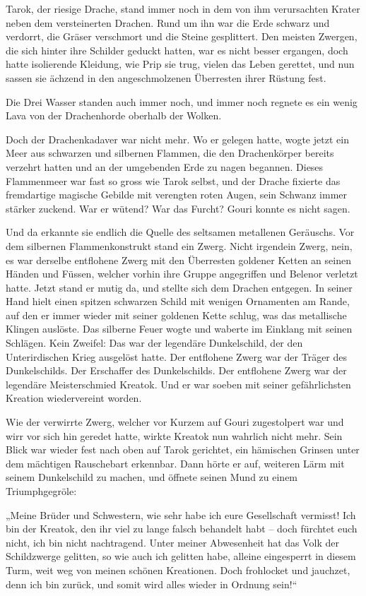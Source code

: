 Tarok, der riesige Drache, stand immer noch in dem von ihm verursachten Krater neben dem versteinerten Drachen. Rund um ihn war die Erde schwarz und verdorrt, die Gräser verschmort und die Steine gesplittert. Den meisten Zwergen, die sich hinter ihre Schilder geduckt hatten, war es nicht besser ergangen, doch hatte isolierende Kleidung, wie Prip sie trug, vielen das Leben gerettet, und nun sassen sie ächzend in den angeschmolzenen Überresten ihrer Rüstung fest.

Die Drei Wasser standen auch immer noch, und immer noch regnete es ein wenig Lava von der Drachenhorde oberhalb der Wolken.

Doch der Drachenkadaver war nicht mehr. Wo er gelegen hatte, wogte jetzt ein Meer aus schwarzen und silbernen Flammen, die den Drachenkörper bereits verzehrt hatten und an der umgebenden Erde zu nagen begannen. Dieses Flammenmeer war fast so gross wie Tarok selbst, und der Drache fixierte das fremdartige magische Gebilde mit verengten roten Augen, sein Schwanz immer stärker zuckend. War er wütend? War das Furcht? Gouri konnte es nicht sagen.

Und da erkannte sie endlich die Quelle des seltsamen metallenen Geräuschs. Vor dem silbernen Flammenkonstrukt stand ein Zwerg. Nicht irgendein Zwerg, nein, es war derselbe entflohene Zwerg mit den Überresten goldener Ketten an seinen Händen und Füssen, welcher vorhin ihre Gruppe angegriffen und Belenor verletzt hatte. Jetzt stand er mutig da, und stellte sich dem Drachen entgegen. In seiner Hand hielt einen spitzen schwarzen Schild mit wenigen Ornamenten am Rande, auf den er immer wieder mit seiner goldenen Kette schlug, was das metallische Klingen auslöste. Das silberne Feuer wogte und waberte im Einklang mit seinen Schlägen. Kein Zweifel: Das war der legendäre Dunkelschild, der den Unterirdischen Krieg ausgelöst hatte. Der entflohene Zwerg war der Träger des Dunkelschilds. Der Erschaffer des Dunkelschilds. Der entflohene Zwerg war der legendäre Meisterschmied Kreatok. Und er war soeben mit seiner gefährlichsten Kreation wiedervereint worden.

Wie der verwirrte Zwerg, welcher vor Kurzem auf Gouri zugestolpert war und wirr vor sich hin geredet hatte, wirkte Kreatok nun wahrlich nicht mehr. Sein Blick war wieder fest nach oben auf Tarok gerichtet, ein hämischen Grinsen unter dem mächtigen Rauschebart erkennbar. Dann hörte er auf, weiteren Lärm mit seinem Dunkelschild zu machen, und öffnete seinen Mund zu einem Triumphgegröle:

„Meine Brüder und Schwestern, wie sehr habe ich eure Gesellschaft vermisst! Ich bin der Kreatok, den ihr viel zu lange falsch behandelt habt – doch fürchtet euch nicht, ich bin nicht nachtragend. Unter meiner Abwesenheit hat das Volk der Schildzwerge gelitten, so wie auch ich gelitten habe, alleine eingesperrt in diesem Turm, weit weg von meinen schönen Kreationen. Doch frohlocket und jauchzet, denn ich bin zurück, und somit wird alles wieder in Ordnung sein!“

